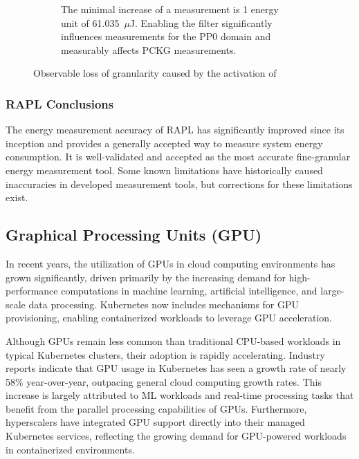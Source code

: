 \begin{itemize}
\begin{figure}[H]
\begin{subfigure}[t]{0.48\textwidth}
            \caption{The minimal increase of a measurement is 1 energy unit of 61.035~$\mu$J. Enabling the filter significantly influences measurements for the PP0 domain and measurably affects PCKG measurements.}
            \label{fig:rapl_filter_granularity_loss_energy}
        \end{subfigure}
        \caption[RAPL ]{Observable loss of granularity caused by the activation of \parencite{schone2024energy}}
        \label{fig:rapl_filter_granularity_loss}
    \end{figure}
\end{itemize}

\subsubsection{RAPL Conclusions}

The energy measurement accuracy of RAPL has significantly improved since its inception and provides a generally accepted way to measure system energy consumption. It is well-validated and accepted as the most accurate fine-granular energy measurement tool. Some known limitations have historically caused inaccuracies in developed measurement tools, but corrections for these limitations exist.

\subsection{Graphical Processing Units (GPU)}

In recent years, the utilization of GPUs in cloud computing environments has grown significantly, driven primarily by the increasing demand for high-performance computations in machine learning, artificial intelligence, and large-scale data processing\cite{jouppi2017datacenter}. Kubernetes now includes mechanisms for GPU provisioning, enabling containerized workloads to leverage GPU acceleration\cite{k8s_gpu_support}.

Although GPUs remain less common than traditional CPU-based workloads in typical Kubernetes clusters, their adoption is rapidly accelerating. Industry reports indicate that GPU usage in Kubernetes has seen a growth rate of nearly 58\% year-over-year, outpacing general cloud computing growth rates\cite{datadog_report}. This increase is largely attributed to ML workloads and real-time processing tasks that benefit from the parallel processing capabilities of GPUs\cite{tensorflow_k8s}. Furthermore, hyperscalers have integrated GPU support directly into their managed Kubernetes services, reflecting the growing demand for GPU-powered workloads in containerized environments.

